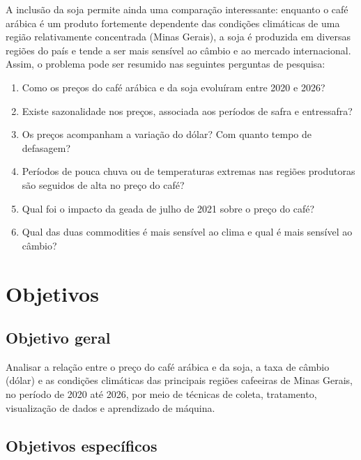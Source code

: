 \documentclass{article}
\begin{document}
A inclusão da soja permite ainda uma comparação interessante: enquanto o café arábica é um produto
fortemente dependente das condições climáticas de uma região relativamente concentrada (Minas Gerais), a
soja é produzida em diversas regiões do país e tende a ser mais sensível ao câmbio e ao mercado
internacional. Assim, o problema pode ser resumido nas seguintes perguntas de pesquisa:

\begin{enumerate}[label=\textbf{P\arabic*.}]
      \item Como os preços do café arábica e da soja evoluíram entre 2020 e 2026?
      \item Existe sazonalidade nos preços, associada aos períodos de safra e entressafra?
      \item Os preços acompanham a variação do dólar? Com quanto tempo de defasagem?
      \item Períodos de pouca chuva ou de temperaturas extremas nas regiões produtoras são seguidos de alta
            no preço do café?
      \item Qual foi o impacto da geada de julho de 2021 sobre o preço do café?
      \item Qual das duas commodities é mais sensível ao clima e qual é mais sensível ao câmbio?
\end{enumerate}


\section{Objetivos}

\subsection{Objetivo geral}

Analisar a relação entre o preço do café arábica e da soja, a taxa de câmbio (dólar) e as condições
climáticas das principais regiões cafeeiras de Minas Gerais, no período de 2020 até 2026, por meio de
técnicas de coleta, tratamento, visualização de dados e aprendizado de máquina.

\subsection{Objetivos específicos}
\end{document}
